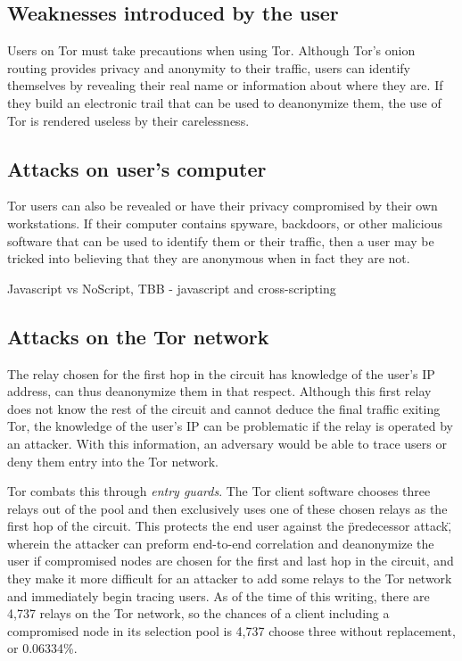\documentclass[journal]{IEEEtran}
\begin{document}
\subsection{Weaknesses introduced by the user}

Users on Tor must take precautions when using Tor. Although Tor's onion routing provides privacy and anonymity to their traffic, users can identify themselves by revealing their real name or information about where they are. If they build an electronic trail that can be used to deanonymize them, the use of Tor is rendered useless by their carelessness.



\subsection{Attacks on user's computer}

Tor users can also be revealed or have their privacy compromised by their own workstations. If their computer contains spyware, backdoors, or other malicious software that can be used to identify them or their traffic, then a user may be tricked into believing that they are anonymous when in fact they are not.

Javascript vs NoScript, TBB - javascript and cross-scripting


\subsection{Attacks on the Tor network}

The relay chosen for the first hop in the circuit has knowledge of the user's IP address, can thus deanonymize them in that respect. Although this first relay does not know the rest of the circuit and cannot deduce the final traffic exiting Tor, the knowledge of the user's IP can be problematic if the relay is operated by an attacker. With this information, an adversary would be able to trace users or deny them entry into the Tor network.

Tor combats this through \textit{entry guards}. The Tor client software chooses three relays out of the pool and then exclusively uses one of these chosen relays as the first hop of the circuit. This protects the end user against the \"predecessor attack\", wherein the attacker can preform end-to-end correlation and deanonymize the user if compromised nodes are chosen for the first and last hop in the circuit,\cite{Wright2004} and they make it more difficult for an attacker to add some relays to the Tor network and immediately begin tracing users. As of the time of this writing, there are 4,737 relays on the Tor network, so the chances of a client including a compromised node in its selection pool is 4,737 choose three without replacement, or 0.06334\%.
\end{document}
